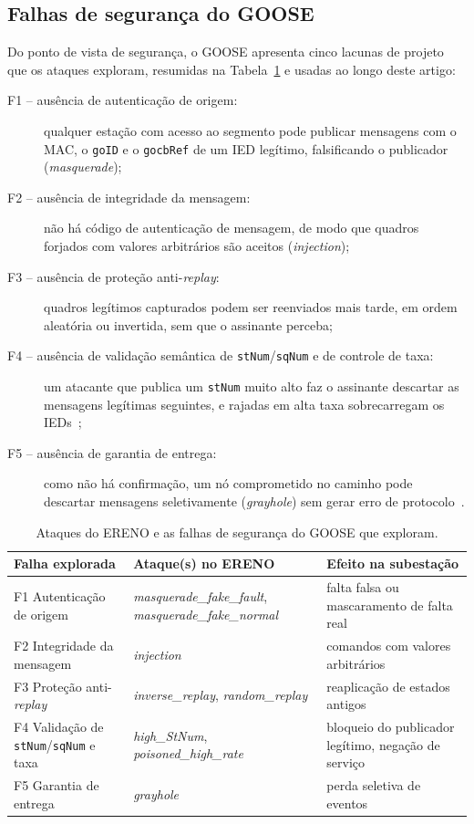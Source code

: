 \documentclass[12pt]{article}
\newcommand{\ataque}[1]{\textit{#1}}
\begin{document}
\subsection{Falhas de segurança do GOOSE}

Do ponto de vista de segurança, o GOOSE apresenta cinco lacunas de projeto que
os ataques exploram, resumidas na Tabela~\ref{tab:falhas} e usadas ao longo
deste artigo:
\begin{description}
\item[F1 -- ausência de autenticação de origem:] qualquer estação com acesso
  ao segmento pode publicar mensagens com o MAC, o \texttt{goID} e o
  \texttt{gocbRef} de um IED legítimo, falsificando o publicador
  (\textit{masquerade});
\item[F2 -- ausência de integridade da mensagem:] não há código de autenticação
  de mensagem, de modo que quadros forjados com valores arbitrários são aceitos
  (\textit{injection});
\item[F3 -- ausência de proteção anti-\textit{replay}:] quadros legítimos
  capturados podem ser reenviados mais tarde, em ordem aleatória ou invertida,
  sem que o assinante perceba;
\item[F4 -- ausência de validação semântica de \texttt{stNum}/\texttt{sqNum}
  e de controle de taxa:] um atacante que publica um \texttt{stNum} muito alto
  faz o assinante descartar as mensagens legítimas seguintes, e rajadas em alta
  taxa sobrecarregam os IEDs~\cite{kush2014poisoned,hoyos2012exploiting};
\item[F5 -- ausência de garantia de entrega:] como não há confirmação, um nó
  comprometido no caminho pode descartar mensagens seletivamente
  (\textit{grayhole}) sem gerar erro de protocolo~\cite{kulkarni2026grayhole}.
\end{description}

\begin{table}[!htbp]
\centering
\caption{Ataques do ERENO e as falhas de segurança do GOOSE que exploram.}
\label{tab:falhas}
\small
\begin{tabular}{p{4.6cm}p{4.4cm}p{4.2cm}}
\toprule
Falha explorada & Ataque(s) no ERENO & Efeito na subestação\\
\midrule
F1 Autenticação de origem & \ataque{masquerade\_fake\_fault}, \ataque{masquerade\_fake\_normal} & falta falsa ou mascaramento de falta real\\
F2 Integridade da mensagem & \ataque{injection} & comandos com valores arbitrários\\
F3 Proteção anti-\textit{replay} & \ataque{inverse\_replay}, \ataque{random\_replay} & reaplicação de estados antigos\\
F4 Validação de \texttt{stNum}/\texttt{sqNum} e taxa & \ataque{high\_StNum}, \ataque{poisoned\_high\_rate} & bloqueio do publicador legítimo, negação de serviço\\
F5 Garantia de entrega & \ataque{grayhole} & perda seletiva de eventos\\
\bottomrule
\end{tabular}
\end{table}
\end{document}
